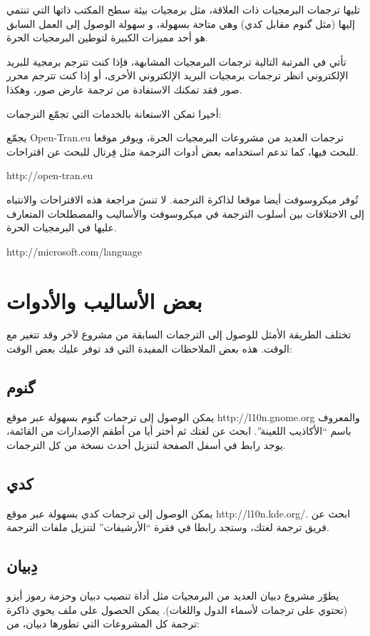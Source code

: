 تليها ترجمات البرمجيات ذات العلاقة، مثل برمجيات بيئة سطح المكتب ذاتها
التي تنتمي إليها (مثل گنوم مقابل كدي) وهي متاحة بسهولة، و سهولة الوصول
إلى العمل السابق هو أحد مميزات الكبيرة لتوطين البرمجيات الحرة.

تأتي في المرتبة التالية ترجمات البرمجيات المشابهة، فإذا كنت تترجم برمجية
للبريد الإلكتروني انظر ترجمات برمجيات البريد الإلكتروني الأخرى، أو إذا
كنت تترجم محرر صور فقد تمكنك الاستفادة من ترجمة عارض صور، وهكذا.

أخيرا تمكن الاستعانة بالخدمات التي تجمّع الترجمات:

\startitemize[1]
\item يجمّع Open-Tran.eu ترجمات العديد من مشروعات البرمجيات الحرة، ويوفر
موقعا للبحث فيها، كما تدعم استخدامه بعض أدوات الترجمة مثل فِرتال للبحث
عن اقتراحات.

 http://open-tran.eu 
\item تُوفر ميكروسوفت أيضا موقعا لذاكرة الترجمة. لا تنسَ مراجعة هذه
الاقتراحات والانتباه إلى الاختلافات بين أسلوب الترجمة في ميكروسوفت
والأساليب والمصطلحات المتعارف عليها في البرمجيات الحرة.

 http://microsoft.com/language
\stopitemize
\section{بعض الأساليب والأدوات}
تختلف الطريقة الأمثل للوصول إلى الترجمات السابقة من مشروع لآخر وقد تتغير
مع الوقت. هذه بعض الملاحظات المفيدة التي قد توفر عليك بعض الوقت:

\subsection{گنوم}
يمكن الوصول إلى ترجمات گنوم بسهولة عبر موقع http://l10n.gnome.org
والمعروف باسم “الأكاذيب اللعينة”. ابحث عن لغتك ثم أختر أيا من أطقم
الإصدارات من القائمة، يوجد رابط في أسفل الصفحة لتنزيل أحدث نسخة من كل
الترجمات.

\subsection{كدي}
يمكن الوصول إلى ترجمات كدي بسهولة عبر موقع http://l10n.kde.org/. ابحث عن
فريق ترجمة لغتك، وستجد رابطا في فقرة “الأرشيفات” لتنزيل ملفات الترجمة.

\subsection{دِبيان}
يطوّر مشروع دبيان العديد من البرمجيات مثل أداة تنصيب دبيان وحزمة رموز
أيزو (تحتوي على ترجمات لأسماء الدول واللغات). يمكن الحصول على ملف يحوي
ذاكرة ترجمة كل المشروعات التي تطورها دبيان، من:

